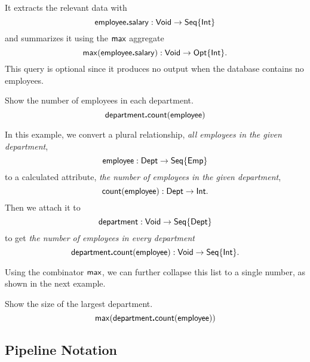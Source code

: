 It extracts the relevant data with
\begin{equation*}
    \mathsf{employee}\boldsymbol{.}\mathsf{salary} : \mathsf{Void} \to \mathsf{Seq}{\left\{\mathsf{Int}\right\}}
\end{equation*}
and summarizes it using the $\mathsf{max}$ aggregate
\begin{equation*}
    \mathsf{max}(\mathsf{employee}\boldsymbol{.}\mathsf{salary}) : \mathsf{Void} \to \mathsf{Opt}{\left\{\mathsf{Int}\right\}}.
\end{equation*}
This query is optional since it produces no output when the database contains
no employees.

\begin{demo}
    \label{ex:department-count-employee}
    Show the number of employees in each department.
    \begin{equation*}
        \mathsf{department}\boldsymbol{.}\mathsf{count}(\mathsf{employee})
    \end{equation*}
\end{demo}

In this example, we convert a plural relationship, \emph{all employees in the
given department},
\begin{equation*}
    \mathsf{employee} : \mathsf{Dept} \to \mathsf{Seq}{\left\{\mathsf{Emp}\right\}}
\end{equation*}
to a calculated attribute, \emph{the number of employees in the given
department},
\begin{equation*}
    \mathsf{count}(\mathsf{employee}) : \mathsf{Dept} \to \mathsf{Int}.
\end{equation*}
Then we attach it to
\begin{equation*}
    \mathsf{department} : \mathsf{Void} \to \mathsf{Seq}{\left\{\mathsf{Dept}\right\}}
\end{equation*}
to get \emph{the number of employees in every department}
\begin{equation*}
    \mathsf{department}\boldsymbol{.}\mathsf{count}(\mathsf{employee}) : \mathsf{Void} \to \mathsf{Seq}{\left\{\mathsf{Int}\right\}}.
\end{equation*}

Using the combinator $\mathsf{max}$, we can further collapse this list to a single
number, as shown in the next example.

\begin{demo}
    \label{ex:max-department-count-employee}
    Show the size of the largest department.
    \begin{equation*}
        \mathsf{max}(\mathsf{department}\boldsymbol{.}\mathsf{count}(\mathsf{employee}))
    \end{equation*}
\end{demo}

\subsection*{Pipeline Notation}

